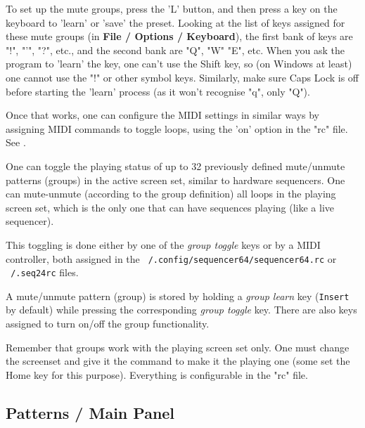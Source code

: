    To set up the mute groups, press the 'L' button, and then press a key on
   the keyboard to 'learn' or 'save' the preset. Looking at the list of keys
   assigned for these mute groups (in \textbf{File / Options / Keyboard}),
   the first bank of keys are "!", "'", "?", etc., and the second bank are
   "Q", "W" "E", etc.  When you ask the program to 'learn' the key, one can't
   use the Shift key, so (on Windows at least) one cannot use the "!" or
   other symbol keys.  Similarly, make sure Caps Lock is off before starting
   the 'learn' process (as it won't recognise "q", only "Q").

   Once that works, one can configure the MIDI settings in similar ways
   by assigning MIDI commands to toggle loops, using 
   the 'on' option in the "rc" file.
   See .

	One can toggle the playing status of up to 32 previously
	defined mute/unmute patterns (groups) in the active screen
	set, similar to hardware sequencers.
   One can mute-unmute (according to the group definition) all loops in the
   playing screen set, which is the only one that can have sequences playing
   (like a live sequencer).

	This toggling is done either by one of the \textsl{group toggle} keys
	or by a MIDI controller, both assigned in the
   \texttt{~/.config/sequencer64/sequencer64.rc} or \texttt{~/.seq24rc} files.

	A mute/unmute pattern (group) is stored by holding a
   \textsl{group learn} key (\texttt{Insert} by default) while pressing the
   corresponding \textsl{group toggle} key.
	There are also keys assigned to turn on/off the group functionality.

   Remember that groups work with the playing screen set only.
   One must change the screenset and give it the command to make it the
   playing one
   (some set the Home key for this purpose).
   Everything is configurable in the "rc" file.

\subsection{Patterns / Main Panel}
\label{subsec:seq64_patterns_panel_main}

